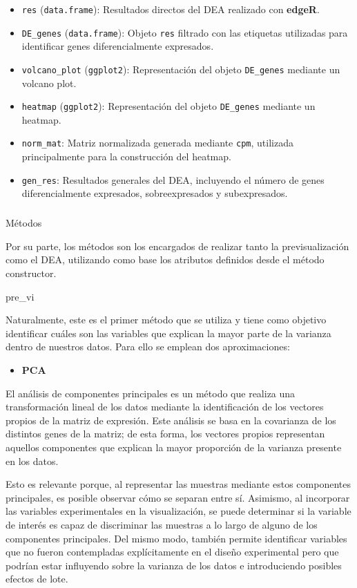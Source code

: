 \documentclass[
  10pt,
]{article}
\makeatletter
\let\oldsubparagraph\subparagraph
\renewcommand{\subparagraph}{
    \@ifstar
      \xxxSubParagraphStar
      \xxxSubParagraphNoStar
  }
\newcommand{\xxxSubParagraphStar}[1]{\oldsubparagraph*{#1}\mbox{}}
\newcommand{\xxxSubParagraphNoStar}[1]{\oldsubparagraph{#1}\mbox{}}
\providecommand{\tightlist}{%
  \setlength{\itemsep}{0pt}\setlength{\parskip}{0pt}}
\makeatother
\begin{document}
\begin{itemize}
  \begin{itemize}
  \item
    \texttt{res} (\texttt{data.frame}): Resultados directos del DEA
    realizado con \textbf{edgeR}.
  \item
    \texttt{DE\_genes} (\texttt{data.frame}): Objeto \texttt{res}
    filtrado con las etiquetas utilizadas para identificar genes
    diferencialmente expresados.
  \item
    \texttt{volcano\_plot} (\texttt{ggplot2}): Representación del objeto
    \texttt{DE\_genes} mediante un volcano plot.
  \item
    \texttt{heatmap} (\texttt{ggplot2}): Representación del objeto
    \texttt{DE\_genes} mediante un heatmap.
  \item
    \texttt{norm\_mat}: Matriz normalizada generada mediante
    \texttt{cpm}, utilizada principalmente para la construcción del
    heatmap.
  \item
    \texttt{gen\_res}: Resultados generales del DEA, incluyendo el
    número de genes diferencialmente expresados, sobreexpresados y
    subexpresados.
  \end{itemize}
\end{itemize}

\subparagraph{Métodos}\label{muxe9todos}

Por su parte, los métodos son los encargados de realizar tanto la
previsualización como el DEA, utilizando como base los atributos
definidos desde el método constructor.

pre\_vi

Naturalmente, este es el primer método que se utiliza y tiene como
objetivo identificar cuáles son las variables que explican la mayor
parte de la varianza dentro de nuestros datos. Para ello se emplean dos
aproximaciones:

\begin{itemize}
\tightlist
\item
  \textbf{PCA}
\end{itemize}

El análisis de componentes principales es un método que realiza una
transformación lineal de los datos mediante la identificación de los
vectores propios de la matriz de expresión. Este análisis se basa en la
covarianza de los distintos genes de la matriz; de esta forma, los
vectores propios representan aquellos componentes que explican la mayor
proporción de la varianza presente en los datos.

Esto es relevante porque, al representar las muestras mediante estos
componentes principales, es posible observar cómo se separan entre sí.
Asimismo, al incorporar las variables experimentales en la
visualización, se puede determinar si la variable de interés es capaz de
discriminar las muestras a lo largo de alguno de los componentes
principales. Del mismo modo, también permite identificar variables que
no fueron contempladas explícitamente en el diseño experimental pero que
podrían estar influyendo sobre la varianza de los datos e introduciendo
posibles efectos de lote.
\end{document}
